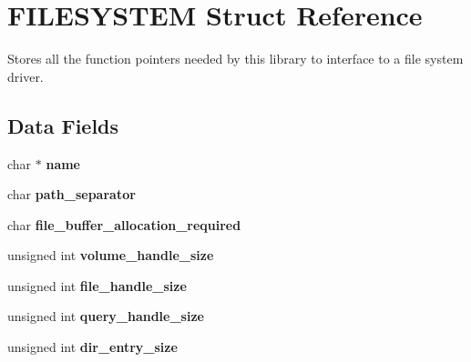 \hypertarget{struct_f_i_l_e_s_y_s_t_e_m}{\section{F\-I\-L\-E\-S\-Y\-S\-T\-E\-M Struct Reference}
\label{struct_f_i_l_e_s_y_s_t_e_m}
}


Stores all the function pointers needed by this library to interface to a file system driver.  


\subsection*{Data Fields}
\begin{DoxyCompactItemize}
\item 
\hypertarget{struct_f_i_l_e_s_y_s_t_e_m_a95ecf5786213fdfe557aff8b2c170f05}{char $\ast$ {\bfseries name}}\label{struct_f_i_l_e_s_y_s_t_e_m_a95ecf5786213fdfe557aff8b2c170f05}

\item 
\hypertarget{struct_f_i_l_e_s_y_s_t_e_m_a06ec17ae3fd1dcae047427bc230fffa5}{char {\bfseries path\-\_\-separator}}\label{struct_f_i_l_e_s_y_s_t_e_m_a06ec17ae3fd1dcae047427bc230fffa5}

\item 
\hypertarget{struct_f_i_l_e_s_y_s_t_e_m_a8cf48f02c7b221e422fce759aa28859d}{char {\bfseries file\-\_\-buffer\-\_\-allocation\-\_\-required}}\label{struct_f_i_l_e_s_y_s_t_e_m_a8cf48f02c7b221e422fce759aa28859d}

\item 
\hypertarget{struct_f_i_l_e_s_y_s_t_e_m_a03e0e83a58d907150fcabcce84618f6c}{unsigned int {\bfseries volume\-\_\-handle\-\_\-size}}\label{struct_f_i_l_e_s_y_s_t_e_m_a03e0e83a58d907150fcabcce84618f6c}

\item 
\hypertarget{struct_f_i_l_e_s_y_s_t_e_m_a7180866b094cc7239d691668f2aa5e48}{unsigned int {\bfseries file\-\_\-handle\-\_\-size}}\label{struct_f_i_l_e_s_y_s_t_e_m_a7180866b094cc7239d691668f2aa5e48}

\item 
\hypertarget{struct_f_i_l_e_s_y_s_t_e_m_a55374b78fd5bc204bd529d3f3561dbad}{unsigned int {\bfseries query\-\_\-handle\-\_\-size}}\label{struct_f_i_l_e_s_y_s_t_e_m_a55374b78fd5bc204bd529d3f3561dbad}

\item 
\hypertarget{struct_f_i_l_e_s_y_s_t_e_m_a431abbf19ed82d0702a1598fb238a34b}{unsigned int {\bfseries dir\-\_\-entry\-\_\-size}}\label{struct_f_i_l_e_s_y_s_t_e_m_a431abbf19ed82d0702a1598fb238a34b}


\end{DoxyCompactItemize}
